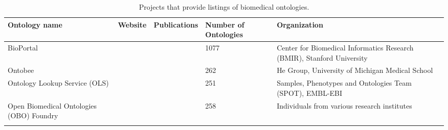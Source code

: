 \documentclass{article}
\begin{document}
\begin{xltabular}{\textwidth}{p{3cm}|p{2.2cm}|p{2.2cm}|p{2.2cm}|p{6cm}}
Ontology name
&
Website
&
Publications
&
Number of Ontologies
&
Organization
\\


\hline
\hline


BioPortal
&
\cite{bioportal_website}
&
\cite{bioportal_publication}
&
1077
&
Center for Biomedical Informatics Research (BMIR), Stanford University
\cite{bioportal_group}
\\


\hline


Ontobee
&
\cite{ontobee_website}
&
\cite{ontobee_publication}
&
262
&
He Group,
University of Michigan Medical School
\cite{ontobee_group}
\\


\hline


Ontology Lookup Service (OLS)
&
\cite{ols_website}
&
\cite{ols_publication1}
\cite{ols_publication2}
&
251
&
Samples, Phenotypes and Ontologies Team (SPOT), EMBL-EBI
\cite{ols_group}
\\


\hline


Open Biomedical Ontologies (OBO) Foundry
&
\cite{obo_website}
&
\cite{obo_publication}
&
258
&
Individuals from various research institutes
\\


\caption{Projects that provide listings of biomedical ontologies.}
\label{table:ontologies}
\end{xltabular}
\end{document}
